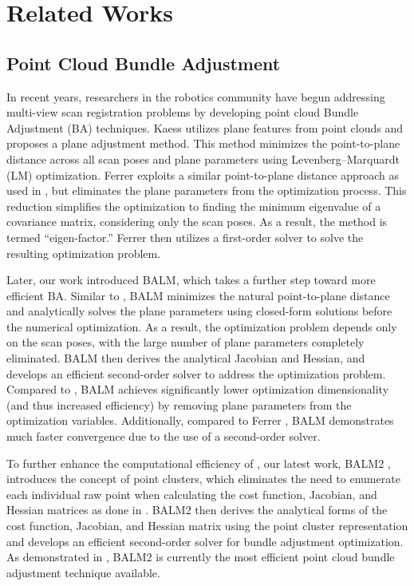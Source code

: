 \section{Related Works}
\label{sec.relatedWorks}

\subsection{Point Cloud Bundle Adjustment}

In recent years, researchers in the robotics community have begun addressing multi-view scan registration problems by developing point cloud Bundle Adjustment (BA) techniques.
Kaess \cite{pa, slamip, kfpslam} utilizes plane features from point clouds and proposes a plane adjustment method. This method minimizes the point-to-plane distance across all scan poses and plane parameters using Levenberg–Marquardt (LM) optimization.
Ferrer \cite{ferrer2019eigen} exploits a similar point-to-plane distance approach as used in \cite{pa}, but eliminates the plane parameters from the optimization process. This reduction simplifies the optimization to finding the minimum eigenvalue of a covariance matrix, considering only the scan poses. As a result, the method is termed ``eigen-factor.'' Ferrer \cite{ferrer2019eigen} then utilizes a first-order solver to solve the resulting optimization problem.

Later, our work \cite{liu2021balm} introduced BALM, which takes a further step toward more efficient BA. Similar to \cite{pa, ferrer2019eigen}, BALM minimizes the natural point-to-plane distance and analytically solves the plane parameters using closed-form solutions before the numerical optimization. As a result, the optimization problem depends only on the scan poses, with the large number of plane parameters completely eliminated. BALM then derives the analytical Jacobian and Hessian, and develops an efficient second-order solver to address the optimization problem. Compared to \cite{pa, slamip, kfpslam}, BALM achieves significantly lower optimization dimensionality (and thus increased efficiency) by removing plane parameters from the optimization variables. Additionally, compared to Ferrer \cite{ferrer2019eigen}, BALM demonstrates much faster convergence due to the use of a second-order solver.

To further enhance the computational efficiency of \cite{liu2021balm}, our latest work, BALM2 \cite{liu2023efficient}, introduces the concept of point clusters, which eliminates the need to enumerate each individual raw point when calculating the cost function, Jacobian, and Hessian matrices as done in \cite{liu2021balm}. BALM2 then derives the analytical forms of the cost function, Jacobian, and Hessian matrix using the point cluster representation and develops an efficient second-order solver for bundle adjustment optimization. As demonstrated in \cite{liu2023efficient}, BALM2 is currently the most efficient point cloud bundle adjustment technique available.

